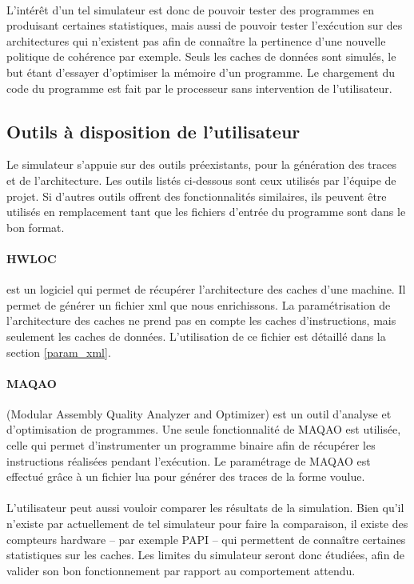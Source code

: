 \paragraph{}
L'intérêt d'un tel simulateur est donc de pouvoir tester des programmes en produisant certaines statistiques, mais aussi de pouvoir tester l'exécution sur des architectures qui n'existent pas afin de connaître la pertinence d'une nouvelle politique de cohérence par exemple. Seuls les caches de données sont simulés, le but étant d'essayer d'optimiser la mémoire d'un programme. Le chargement du code du programme est fait par le processeur sans intervention de l'utilisateur.

\subsection{Outils à disposition de l'utilisateur}

Le simulateur s'appuie sur des outils préexistants, pour la génération des traces et de l'architecture. Les outils listés ci-dessous sont ceux utilisés par l'équipe de projet. Si d'autres outils offrent des fonctionnalités similaires, ils peuvent être utilisés en remplacement tant que les fichiers d'entrée du programme sont dans le bon format.

\paragraph{HWLOC} est un logiciel qui permet de récupérer l'architecture des caches d'une machine. Il permet de générer un fichier xml que nous enrichissons. La paramétrisation de l'architecture des caches ne prend pas en compte les caches d'instructions, mais seulement les caches de données. L'utilisation de ce fichier est détaillé dans la section \ref{param_xml}.

\paragraph{MAQAO} (Modular Assembly Quality Analyzer and Optimizer) est un outil d'analyse et d'optimisation de programmes. Une seule fonctionnalité de \textsf{MAQAO} est utilisée, celle qui permet d'instrumenter un programme binaire afin de récupérer les instructions réalisées pendant l'exécution. Le paramétrage de \textsf{MAQAO} est effectué grâce à un fichier lua pour générer des traces de la forme voulue.

\paragraph{}
L'utilisateur peut aussi vouloir comparer les résultats de la simulation. Bien qu'il n'existe par actuellement de tel simulateur pour faire la comparaison, il existe des compteurs hardware -- par exemple \textsf{PAPI} -- qui permettent de connaître certaines statistiques sur les caches. Les limites du simulateur seront donc étudiées, afin de valider son bon fonctionnement par rapport au comportement attendu.

